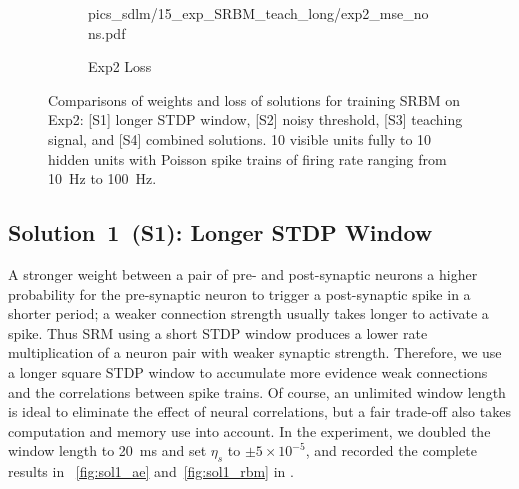 \begin{figure}
\begin{subfigure}[c]{0.45\textwidth}
{			{pics_sdlm/15_exp_SRBM_teach_long/exp2_mse_nons.pdf}}\\
		\caption{Exp2 Loss}
	\end{subfigure}%
	\caption{Comparisons of weights and loss of solutions for training SRBM on Exp2: [S1] longer STDP window, [S2] noisy threshold, [S3] teaching signal, and [S4] combined solutions. 10 visible units fully \DIFdelbeginFL {}\DIFdelendFL \DIFaddbeginFL {}\DIFaddendFL to 10 hidden units with Poisson spike trains of firing rate ranging from 10~Hz to 100~Hz.}
	\label{fig:sols_rbm}
\end{figure}

\subsection{Solution~1~(S1): Longer STDP Window}
A stronger weight between a pair of pre- and post-synaptic neurons \DIFdelbegin {}\DIFdelend \DIFaddbegin {}\DIFaddend a higher probability for the pre-synaptic neuron to trigger a post-synaptic spike in a shorter period; 
a weaker connection strength usually takes longer to activate a spike.
Thus SRM using a short STDP window produces a lower rate multiplication of a neuron pair with weaker synaptic strength.
Therefore, we use a longer square STDP window to accumulate more evidence \DIFdelbegin {}\DIFdelend \DIFaddbegin {}\DIFaddend weak connections and \DIFdelbegin {}\DIFdelend \DIFaddbegin {}\DIFaddend the correlations between spike trains.
Of course, an unlimited window length is ideal to eliminate the effect of neural correlations, but a fair trade-off also takes computation and memory use into account.
In the experiment, we doubled the window length to 20~ms and set $\eta_s$ to $\pm 5 \times 10^{-5}$, and recorded the complete results in \DIFdelbegin {}\DIFdelend \DIFaddbegin {}\DIFaddend ~\ref{fig:sol1_ae} and~\ref{fig:sol1_rbm} in \DIFdelbegin {}\DIFdelend \DIFaddbegin {}\DIFaddend .

